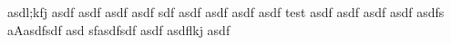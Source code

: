 asdl;kfj asdf asdf asdf asdf sdf asdf asdf asdf asdf test asdf asdf asdf asdf asdfs aAasdfsdf asd sfasdfsdf asdf asdflkj asdf
